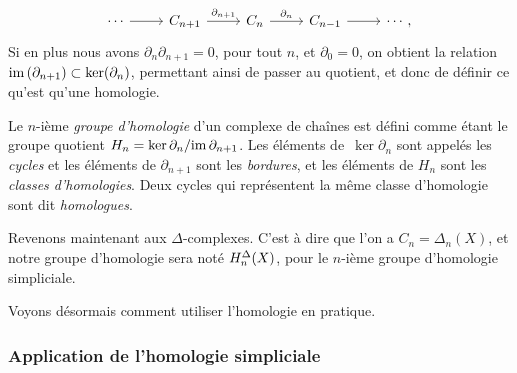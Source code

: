 \[\begin{tikzcd}
\cdots\arrow[r]& C_{n+1}\arrow[r, "\partial_{n+1}"]&C_n\arrow[r,"\partial_n"]&C_{n-1}\arrow[r] & \cdots,
\end{tikzcd}\]
Si en plus nous avons $\partial_n\partial_{n+1}=0$, pour tout $n$, et $\partial_0=0$, on obtient la relation~$\mathrm{im}\,(\partial_{n+1})\subset\ker(\partial_n)$, permettant ainsi de passer au quotient, et donc de définir ce qu'est qu'une homologie.

\begin{definition}\label{def:homology}
Le $n$-ième \emph{groupe d'homologie} d'un complexe de chaînes est défini comme étant le groupe quotient $H_n=\ker\partial_n/\mathrm{im}\,\partial_{n+1}$. Les éléments de~$\ker\partial_n$ sont appelés les \emph{cycles} et les éléments de $\partial_{n+1}$ sont les \emph{bordures}, et les éléments de $H_n$ sont les \emph{classes d'homologies}. Deux cycles qui représentent la même classe d'homologie sont dit \emph{homologues}.
\end{definition}

Revenons maintenant aux $\Delta$-complexes. C'est à dire que l'on a $C_n=\Delta_n(X)$, et notre groupe d'homologie sera noté $H^\Delta_n(X)$, pour le $n$-ième groupe d'homologie simpliciale.

\bigskip Voyons désormais comment utiliser l'homologie en pratique.


\subsubsection{Application de l'homologie simpliciale}

